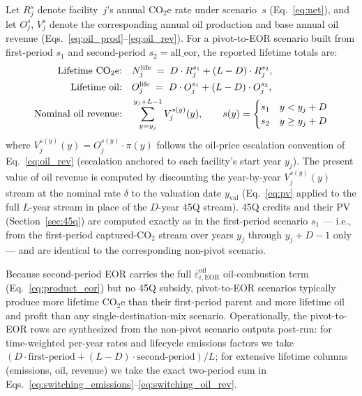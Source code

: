\documentclass[11pt]{article}
\newcommand{\cotwo}{\ensuremath{\mathrm{CO_2}}}
\newcommand{\cotwoe}{\ensuremath{\mathrm{CO_{2}e}}}
\begin{document}
Let $R^{s}_j$ denote facility~$j$'s annual \cotwoe{} rate under scenario~$s$ (Eq.~\ref{eq:net}), and let $O^{s}_j$, $V^{s}_j$ denote the corresponding annual oil production and base annual oil revenue (Eqs.~\ref{eq:oil_prod}--\ref{eq:oil_rev}). For a pivot-to-EOR scenario built from first-period $s_1$ and second-period $s_2 = \text{all\_eor}$, the reported lifetime totals are:
%
\begin{align}
  \text{Lifetime \cotwoe{}:} \quad & N_j^{\text{life}} \;=\; D \cdot R^{s_1}_j + (L - D) \cdot R^{s_2}_j, \label{eq:switching_emissions} \\
  \text{Lifetime oil:}       \quad & O_j^{\text{life}} \;=\; D \cdot O^{s_1}_j + (L - D) \cdot O^{s_2}_j, \label{eq:switching_oil} \\
  \text{Nominal oil revenue:} \quad & \sum_{y=y_j}^{y_j + L - 1} V_j^{s(y)}(y), \qquad s(y) = \begin{cases} s_1 & y < y_j + D \\ s_2 & y \geq y_j + D \end{cases} \label{eq:switching_oil_rev}
\end{align}
%
where $V_j^{s(y)}(y) = O_j^{s(y)} \cdot \pi(y)$ follows the oil-price escalation convention of Eq.~\eqref{eq:oil_rev} (escalation anchored to each facility's start year $y_j$). The present value of oil revenue is computed by discounting the year-by-year $V_j^{s(y)}(y)$ stream at the nominal rate $\delta$ to the valuation date $y_{\text{val}}$ (Eq.~\ref{eq:pv} applied to the full $L$-year stream in place of the $D$-year 45Q stream). 45Q credits and their PV (Section~\ref{sec:45q}) are computed exactly as in the first-period scenario $s_1$ --- i.e., from the first-period captured-\cotwo{} stream over years $y_j$ through $y_j + D - 1$ only --- and are identical to the corresponding non-pivot scenario.

Because second-period EOR carries the full $\bar\varepsilon_{i,\text{EOR}}^{\text{oil}}$ oil-combustion term (Eq.~\ref{eq:product_eor}) but no 45Q subsidy, pivot-to-EOR scenarios typically produce more lifetime \cotwoe{} than their first-period parent and more lifetime oil and profit than any single-destination-mix scenario. Operationally, the pivot-to-EOR rows are synthesized from the non-pivot scenario outputs post-run: for time-weighted per-year rates and lifecycle emissions factors we take $(D \cdot \text{first-period} + (L - D) \cdot \text{second-period})/L$; for extensive lifetime columns (emissions, oil, revenue) we take the exact two-period sum in Eqs.~\eqref{eq:switching_emissions}--\eqref{eq:switching_oil_rev}.
\end{document}
